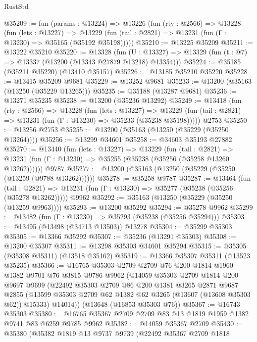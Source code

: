 \begin{lexlean}{RustStd}
\begin{coremodule}
@35209 := fun (params : @13224) =>
  @13226
    (fun (rty : @2566) =>
    @13228
      (fun (lets : @13227) =>
      @13229 (fun (tail : @2821) => @13231 (fun (Γ : @13230) => @35165 (@35192 @35198)))))
@35210 := @13225 @35209
@35211 := @13222 @35210
@35220 := @13328
    (fun (U : @13327) => @13329 (fun (t : @7) => @13337 (@13200 (@13343 @27879 @13218) @13354)))
@35224 := @35185 (@35211 @35220) (@13410 @35157)
@35226 := @13185 @35210 @35220
@35228 := @13415 @35209 @9681
@35229 := @13252 @9681
@35233 := @13200 (@35163 (@13250 (@35229 @13265)))
@35235 := @35188 (@13287 @9681)
@35236 := @13271 @35235
@35238 := @13200 (@35236 @13292)
@35249 := @13418
    (fun (rty : @2566) =>
    @13228
      (fun (lets : @13227) =>
      @13229 (fun (tail : @2821) => @13231 (fun (Γ : @13230) => @35233 (@35238 @35198)))))
    @2753
@35250 := @13256 @2753
@35255 := @13200 (@35163 (@13250 (@35229 (@35250 @13264))))
@35256 := @13299 @34601
@35258 := @34603 @35193 @27882
@35270 := @13440
    (fun (lets : @13227) =>
    @13229
      (fun (tail : @2821) =>
      @13231 (fun (Γ : @13230) => @35255 (@35238 (@35256 (@35258 @13260 @13262))))))
    @9787
@35277 := @13200 (@35163 (@13250 (@35229 (@35250 (@13259 (@9788 @13262))))))
@35278 := @35258 @9787
@35287 := @13464
    (fun (tail : @2821) => @13231 (fun (Γ : @13230) => @35277 (@35238 (@35256 (@35278 @13262)))))
    @9962
@35292 := @35163 (@13250 (@35229 (@35250 (@13259 @9963))))
@35293 := @13200 @35292
@35294 := @35278 @9962
@35299 := @13482 (fun (Γ : @13230) => @35293 (@35238 (@35256 @35294)))
@35303 := @13495 (@13498 (@34713 @13503)) @13278
@35304 := @35299 @35303
@35305 := @13366 @35292
@35307 := @35236 (@13291 @35303)
@35308 := @13200 @35307
@35311 := @13298 @35303 @34601 @35294
@35315 := @35305 (@35308 @35311) (@13518 @35162)
@35319 := @13366 @35307 @35311 (@13523 @35235)
@35366 := @16765
    @35303
    @2709
    @2709
    @76
    @200
    @1814
    @1960
    @1382
    @9701
    @76
    @3815
    @9786
    @9962
    (@14059
      @35303
      @2709
      @1814
      @200
      @9697
      @9699
      (@22492
        @35303
        @2709
        @86
        @200
        @1381
        @3265
        @2871
        @9687
        @2855
        (@13599 @35303 @2709 @62 @1382 @62 @3265 (@13607 (@13608 @35303 @62)) @15333)
        @14014))
    (@13648 (@16853 @35303 @76))
@35367 := @16743 @35303
@35380 := @16765 @35367 @2709 @2709 @83 @13 @1819 @1959 @1382 @9741 @83 @6259 @9785 @9962
@35382 := @14059 @35367 @2709
@35430 := @35380
    (@35382
      @1819
      @13
      @9737
      @9739
      (@22492
        @35367
        @2709
        @1818

\end{coremodule}
\end{lexlean}
